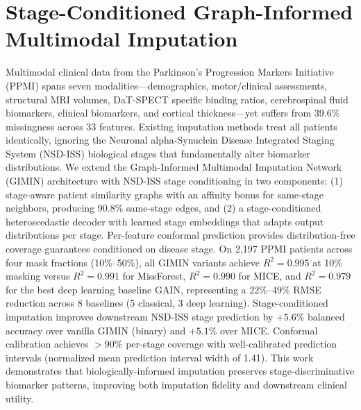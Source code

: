 
\chapter{Stage-Conditioned Graph-Informed Multimodal Imputation}
\label{ch:paper2}\label{p2:ch:paper2}

Multimodal clinical data from the Parkinson's Progression Markers Initiative (PPMI) spans seven modalities---demographics, motor/clinical assessments, structural MRI volumes, DaT-SPECT specific binding ratios, cerebrospinal fluid biomarkers, clinical biomarkers, and cortical thickness---yet suffers from 39.6\% missingness across 33 features. Existing imputation methods treat all patients identically, ignoring the Neuronal alpha-Synuclein Disease Integrated Staging System (NSD-ISS) biological stages that fundamentally alter biomarker distributions. We extend the Graph-Informed Multimodal Imputation Network (GIMIN) architecture with NSD-ISS stage conditioning in two components: (1) stage-aware patient similarity graphs with an affinity bonus for same-stage neighbors, producing 90.8\% same-stage edges, and (2) a stage-conditioned heteroscedastic decoder with learned stage embeddings that adapts output distributions per stage. Per-feature conformal prediction provides distribution-free coverage guarantees conditioned on disease stage. On 2,197 PPMI patients across four mask fractions (10\%--50\%), all GIMIN variants achieve $R^2 = 0.995$ at 10\% masking versus $R^2 = 0.991$ for MissForest, $R^2 = 0.990$ for MICE, and $R^2 = 0.979$ for the best deep learning baseline GAIN, representing a 22\%--49\% RMSE reduction across 8 baselines (5 classical, 3 deep learning). Stage-conditioned imputation improves downstream NSD-ISS stage prediction by $+5.6\%$ balanced accuracy over vanilla GIMIN (binary) and $+5.1\%$ over MICE. Conformal calibration achieves ${>}90\%$ per-stage coverage with well-calibrated prediction intervals (normalized mean prediction interval width of 1.41). This work demonstrates that biologically-informed imputation preserves stage-discriminative biomarker patterns, improving both imputation fidelity and downstream clinical utility.

